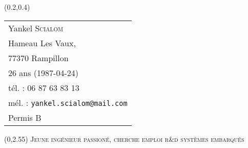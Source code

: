 \documentclass[10pt]{article}
\begin{document}
\thispagestyle{empty}

\begin{textblock}{7}(0.2,0.4)
	\begin{tabular}{l}
		\small
		Yankel \textsc{Scialom}\\
		Hameau Les Vaux,\\ 77370 Rampillon\\
		26 ans (1987-04-24)\\
		tél. : 06 87 63 83 13\\
		mél. : \texttt{yankel.scialom@mail.com}\\
		Permis B
	\end{tabular}
\end{textblock}


\begin{textblock}{16}(0,2.55)
	\centering
	\fontsize{15pt}{18pt}\selectfont
	\textsc{Jeune ingénieur passioné, cherche emploi r\&d systèmes embarqués}
\end{textblock}

\end{document}
